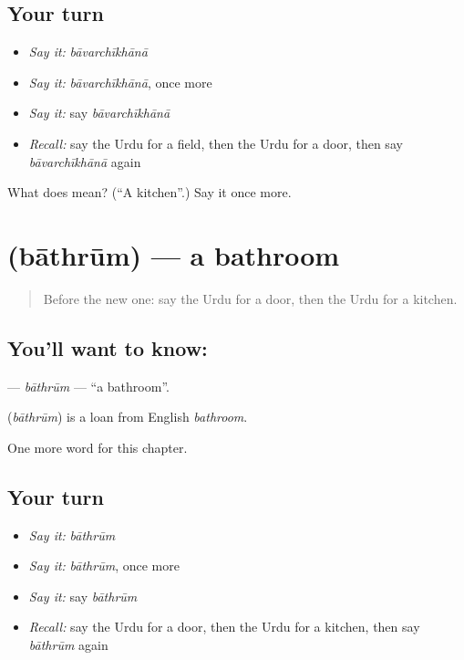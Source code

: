 \subsection*{Your turn}
\begin{itemize}
\raggedright
  \item \emph{Say it:} \emph{bāvarchīkhānā}
  \item \emph{Say it:} \emph{bāvarchīkhānā}, once more
  \item \emph{Say it:} say \emph{bāvarchīkhānā}
  \item \emph{Recall:} say the Urdu for a field, then the Urdu for a door, then say \emph{bāvarchīkhānā} again
\end{itemize}

\begin{tcolorbox}[breakable,colback=teal!4,colframe=teal!35!black,title={Before you move on}]
What does   mean? (\textquotedblleft{}A kitchen\textquotedblright{}.) Say it once more.
\end{tcolorbox}
\section[\texorpdfstring{\ur{باتھ} \ur{روم} (bāthrūm)}{باتھ روم (bāthrūm)}]{  (bāthrūm) — a bathroom}

\label{lesson:UR-C102-bathrum}



\begin{quote}
Before the new one: say the Urdu for a door, then the Urdu for a kitchen.
\end{quote}

\subsection*{You'll want to know:  }
\textbf{ } — \emph{bāthrūm} — \textquotedblleft{}a bathroom\textquotedblright{}.

\begin{cousinweb}
\textbf{ } (\emph{bāthrūm}) is a loan from English \emph{bathroom}.
\end{cousinweb}

\begin{grammarlens}[title={What you've built}]
One more word for this chapter.
\end{grammarlens}

\subsection*{Your turn}
\begin{itemize}
\raggedright
  \item \emph{Say it:} \emph{bāthrūm}
  \item \emph{Say it:} \emph{bāthrūm}, once more
  \item \emph{Say it:} say \emph{bāthrūm}
  \item \emph{Recall:} say the Urdu for a door, then the Urdu for a kitchen, then say \emph{bāthrūm} again
\end{itemize}

